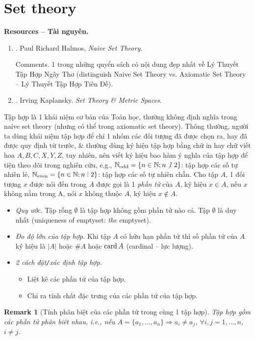 \documentclass[oneside]{book}
\newtheorem{remark}{Remark}
\DeclareRobustCommand{\divby}{%
	\mathrel{\vbox{\baselineskip.65ex\lineskiplimit0pt\hbox{.}\hbox{.}\hbox{.}}}%
}
\begin{document}
\section{Set theory}
\textbf{\textsf{Resources -- Tài nguyên.}}
\begin{enumerate}
	\item \cite{Halmos1960,Halmos1974}. {\sc Paul Richard Halmos}, {\it Naive Set Theory}.
	
	{\sf Comments.} 1 trong những quyển sách có nội dung đẹp nhất về Lý Thuyết Tập Hợp Ngây Thơ (distinguish Naive Set Theory vs. Axiomatic Set Theory -- Lý Thuyết Tập Hợp Tiên Đề).
	\item \cite{Kaplansky1972,Kaplansky1977}. {\sc Irving Kaplansky}. {\it Set Theory \& Metric Spaces}.
\end{enumerate}
Tập hợp là 1 khái niệm cơ bản của Toán học, thường không định nghĩa trong naive set theory (nhưng có thể trong axiomatic set theory). Thông thường, người ta dùng khái niệm tập hợp để chỉ 1 nhóm các đối tượng đã được chọn ra, hay đã được quy định từ trước, \& thường dùng ký hiệu tập hợp bằng chữ in hay chữ viết hoa $A,B,C,X,Y,Z$, tuy nhiên, nên viết ký hiệu bao hàm ý nghĩa của tập hợp để tiện theo dõi trong nghiên cứu, e.g., $\mathbb{N}_{\rm odd} = \{n\in\mathbb{N};n\not{\divby}\ 2\}$: tập hợp các số tự nhiên lẻ, $\mathbb{N}_{\rm even} = \{n\in\mathbb{N};n\divby2\}$: tập hợp các số tự nhiên chẵn. Cho tập $A$, 1 đối tượng $x$ được nói đến trong $A$ được gọi là 1 {\it phần tử} của $A$, ký hiệu $x\in A$, nếu $x$ không nằm trong A, nói $x$ không thuộc $A$, ký hiệu $x\notin A$.
\begin{itemize}
	\item {\it Quy ước.} Tập rỗng $\emptyset$ là tập hợp không gồm phần tử nào cả. Tập $\emptyset$ là duy nhất (uniqueness of emptyset: {\it the} emptyset).
	\item {\it Đo độ lớn của tập hợp.} Khi tập $A$ có hữu hạn phần tử thì số phần tử của $A$ ký hiệu là $|A|$ hoặc $\#A$ hoặc ${\rm card}\,A$ (cardinal -- lực lượng).
	\item {\it2 cách đặt{\tt/}xác định tập hợp.}
	\begin{itemize}
		\item Liệt kê các phần tử của tập hợp.
		\item Chỉ ra tính chất đặc trưng của các phần tử của tập hợp.
	\end{itemize}
\end{itemize}

\begin{remark}[Tính phân biệt của các phần tử trong cùng 1 tập hợp]
	Tập hợp gồm các phần tử phân biêt nhau, i.e., nếu $A = \{a_1,\ldots,a_n\}\Rightarrow a_i\ne a_j$, $\forall i,j = 1,\ldots,n$, $i\ne j$.
\end{remark}
\end{document}
